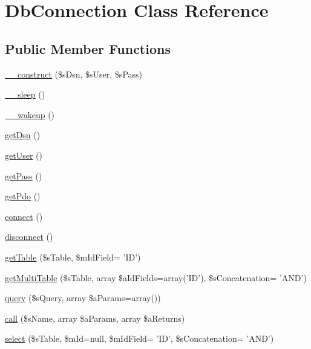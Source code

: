 \hypertarget{class_db_connection}{\section{Db\-Connection Class Reference}
\label{class_db_connection}
}
\subsection*{Public Member Functions}
\begin{DoxyCompactItemize}
\item 
\hyperlink{class_db_connection_a3b56a065a8591f3b8324b84aa2b6e99d}{\-\_\-\-\_\-construct} (\$s\-Dsn, \$s\-User, \$s\-Pass)
\item 
\hyperlink{class_db_connection_a2f87a9eaf06f135a323c3a4f429ecc11}{\-\_\-\-\_\-sleep} ()
\item 
\hyperlink{class_db_connection_a9fab9b70298e9bef12906e3b3431f3c3}{\-\_\-\-\_\-wakeup} ()
\item 
\hyperlink{class_db_connection_a945af842314b399eca5af3c386f006bd}{get\-Dsn} ()
\item 
\hyperlink{class_db_connection_a8a2466ed0cfd8ad83c8567cbd7508dfa}{get\-User} ()
\item 
\hyperlink{class_db_connection_a52ff2ae755efaa935c79e09f0ac690a0}{get\-Pass} ()
\item 
\hyperlink{class_db_connection_a02ad97e6bc80a2caa7d440327f2b5483}{get\-Pdo} ()
\item 
\hyperlink{class_db_connection_a42741e1c5c39cb28b3ec47d7ac69a315}{connect} ()
\item 
\hyperlink{class_db_connection_a4876746134e556f69028877d061083ed}{disconnect} ()
\item 
\hyperlink{class_db_connection_a9d5cbd5705cb5474feee805cc5df642c}{get\-Table} (\$s\-Table, \$m\-Id\-Field= 'I\-D')
\item 
\hyperlink{class_db_connection_a42a1ee80940d4642d210115193523403}{get\-Multi\-Table} (\$s\-Table, array \$a\-Id\-Fields=array('I\-D'), \$s\-Concatenation= 'A\-N\-D')
\item 
\hyperlink{class_db_connection_ae5144ffd2bfc7fff6bb4847d293e26d8}{query} (\$s\-Query, array \$a\-Params=array())
\item 
\hyperlink{class_db_connection_a96b5e2fdad36ec81aae1a3a26ad7acd7}{call} (\$s\-Name, array \$a\-Params, array \$a\-Returns)
\item 
\hyperlink{class_db_connection_ac0fd349a2a6521372a9b68eeb48e4fab}{select} (\$s\-Table, \$m\-Id=null, \$m\-Id\-Field= 'I\-D', \$s\-Concatenation= 'A\-N\-D')

\end{DoxyCompactItemize}
